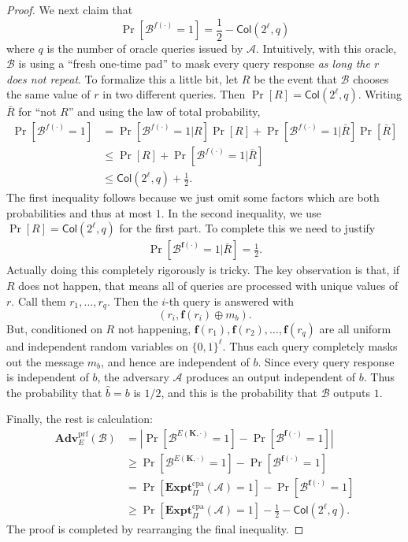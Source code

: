 \documentclass[11pt]{article}
\newcommand{\calA}{\mathcal{A}}
\newcommand{\calB}{\mathcal{B}}
\newcommand{\Adv}{\mathbf{Adv}}
\newcommand{\AdvPRF}[2]{\Adv^{\mathrm{prf}}_{#1}({#2})}
\newcommand{\bits}{\{0,1\}}
\newcommand{\bK}{\mathbf{K}}
\newcommand{\bof}{\mathbf{f}}
\newcommand{\ExptCPA}{\mathbf{Expt}^{\mathrm{cpa}}}
\newcommand{\bhat}{\hat{b}}
\newcommand{\Col}{\mathsf{Col}}
\begin{document}
\begin{proof}
	We next claim that
	\[
	\Pr[\calB^{f(\cdot)}=1] = \frac{1}{2} - \Col(2^\ell,q)
	\]
	where $q$ is the number of oracle queries issued by $\calA$.  Intuitively,
	with this oracle, $\calB$ is using a ``fresh one-time pad'' to mask every
	query response \emph{as long the $r$ does not repeat}. To formalize
	this a little bit,  let $R$ be the event that $\calB$ chooses the
	same value of $r$ in two different queries. Then $\Pr[R] = \Col(2^\ell,q)$.
	Writing $\bar{R}$ for ``not $R$'' and using the law of total probability,
	\begin{align*}
	\Pr[\calB^{f(\cdot)}=1] 
	& = \Pr[\calB^{f(\cdot)}=1|R]\Pr[R] 
	+ \Pr[\calB^{f(\cdot)}=1|\bar{R}]\Pr[\bar{R}]  \\
	& \leq \Pr[R] 
	+ \Pr[\calB^{f(\cdot)}=1|\bar{R}] \\
	& \leq \Col(2^\ell,q) + \frac{1}{2}. 
	\end{align*}
	The first inequality follows because we just omit some factors which are
	both probabilities and thus at most $1$. In the second inequality,
	we use $\Pr[R]=\Col(2^\ell,q)$ for the first part. To complete this
	we need to justify
	\begin{align*}
	\Pr[\calB^{\bof(\cdot)}=1|\bar{R}] = \frac{1}{2}. 
	\end{align*}
	Actually doing this completely rigorously is tricky. The key observation
	is that, if $R$ does not happen, that means all of queries are processed
	with unique values of $r$. Call them $r_1,\ldots,r_q$. Then the $i$-th
	query is answered with
	\[
	(r_i, \bof(r_i)\oplus m_b).
	\]
	But, conditioned on $R$ not happening,
	$\bof(r_1),\bof(r_2),\ldots,\bof(r_q)$ are all uniform and independent
	random variables on $\bits^\ell$. Thus each query completely masks out
	the message $m_b$, and hence are independent of $b$. Since every query
	response is independent of $b$, the adversary $\calA$ produces an output
	independent of $b$. Thus the probability that $\bhat=b$ is $1/2$, and
	this is the probability that $\calB$ outputs $1$.
	
	Finally, the rest is calculation:
	\begin{align*}
	\AdvPRF{E}{\calB} 
	& = |\Pr[\calB^{E(\bK,\cdot)}=1] - \Pr[\calB^{\bof(\cdot)}=1]| \\
	& \geq  \Pr[\calB^{E(\bK,\cdot)}=1] - \Pr[\calB^{\bof(\cdot)}=1] \\
	& =  \Pr[\ExptCPA_{\Pi}(\calA)=1] - \Pr[\calB^{\bof(\cdot)}=1] \\
	& \geq  \Pr[\ExptCPA_{\Pi}(\calA)=1] - \frac{1}{2} - \Col(2^\ell,q).
	\end{align*}
	The proof is completed by rearranging the final inequality.
\end{proof}
	
\end{document}
